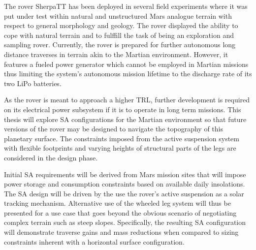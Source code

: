 The rover SherpaTT has been deployed in several field experiments where it was put under test within natural and unstructured Mars analogue terrain with respect to general morphology and geology. The rover displayed the ability to cope with natural terrain and to fulffill the task of being an exploration and sampling rover. Currently, the rover is prepared for further autonomous long distance traverses in terrain akin to the Martian environment. However, it features a fueled power generator which cannot be employed in Martian missions thus limiting the system's autonomous mission lifetime to the discharge rate of its two LiPo batteries.

As the rover is meant to approach a higher \ac{TRL}, further development is required on its electrical power subsystem if it is to operate in long term missions. This thesis will explore \ac{SA} configurations for the Martian environment so that future versions of the rover may be designed to navigate the topography of this planetary surface. The constraints imposed from the active suspension system with flexible footprints and varying heights of structural parts of the legs are considered in the design phase.

Initial \ac{SA} requirements will be derived from Mars mission sites that will impose power storage and consumption constraints based on available daily insolations. The \ac{SA} design will be driven by the use the rover's active suspension as a solar tracking mechanism. Alternative use of the wheeled leg system will thus be presented for a use case that goes beyond the obvious scenario of negotiating complex terrain such as steep slopes. Specifically, the resulting \ac{SA} configuration will demonstrate traverse gains and mass reductions when compared to sizing constraints inherent with a horizontal surface configuration.





